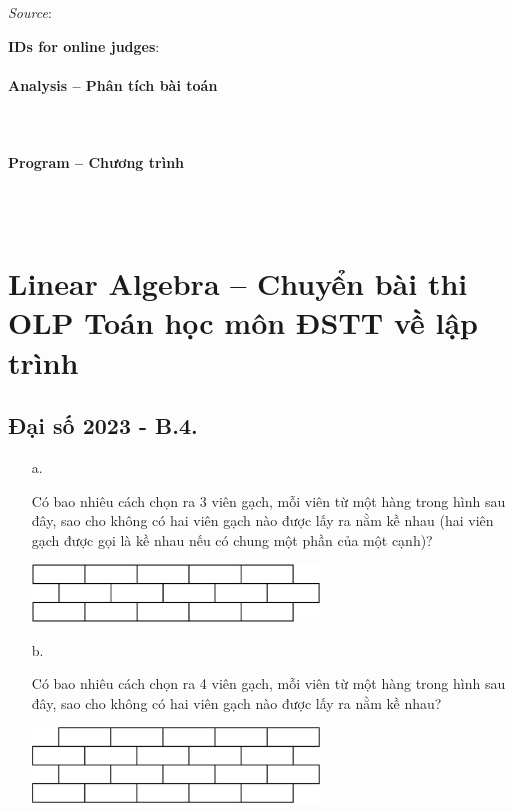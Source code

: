 \documentclass{article}
\begin{document}
\textit{Source}: 

\textbf{IDs for online judges}: 


\paragraph{Analysis -- Phân tích bài toán} \mbox{} \\


\paragraph{Program -- Chương trình} \mbox{} \\


\begin{lstlisting}

\end{lstlisting}





\section{Linear Algebra -- Chuyển bài thi OLP Toán học môn ĐSTT về lập trình}

\subsection{Đại số 2023 - B.4.}
    \begin{enumerate}
        \item[a.] {Có bao nhiêu cách chọn ra 3 viên gạch, mỗi viên từ một hàng trong hình sau đây, sao cho không có hai viên gạch nào được lấy ra nằm kề nhau (hai viên gạch được gọi là kề nhau nếu có chung một phần của một cạnh)?
        
        \begin{center}
            \includegraphics[width=0.6\textwidth]{Figures/01.png}
        \end{center}}
        \item[b.] {Có bao nhiêu cách chọn ra 4 viên gạch, mỗi viên từ một hàng trong hình sau đây, sao cho không có hai viên gạch nào được lấy ra nằm kề nhau?
        
        \begin{center}
            \includegraphics[width=0.6\textwidth]{Figures/02.png}
        \end{center}}
    \end{enumerate}
\end{document}
